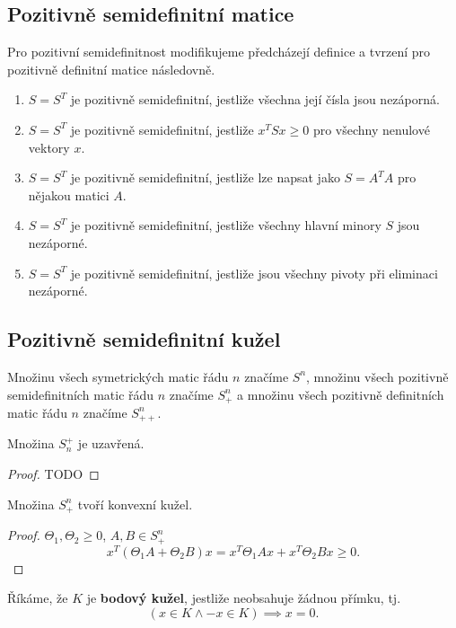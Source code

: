 \subsection*{Pozitivně semidefinitní matice}

Pro pozitivní semidefinitnost modifikujeme předcházejí definice a tvrzení pro pozitivně definitní matice následovně.
\begin{enumerate}
    \item $S = S^T$ je pozitivně semidefinitní, jestliže všechna její čísla jsou nezáporná.
    \item $S = S^T$ je pozitivně semidefinitní, jestliže $x^TSx \geq 0$ pro všechny nenulové vektory $x$.
    \item $S = S^T$ je pozitivně semidefinitní, jestliže lze napsat jako $S = A^T A$ pro nějakou matici $A$.
    \item $S = S^T$ je pozitivně semidefinitní, jestliže všechny hlavní minory $S$ jsou nezáporné.
    \item $S = S^T$ je pozitivně semidefinitní, jestliže jsou všechny pivoty při eliminaci nezáporné.
\end{enumerate}

\subsection*{Pozitivně semidefinitní kužel}

Množinu všech symetrických matic řádu $n$ značíme $S^n$, množinu všech pozitivně semidefinitních matic řádu $n$ značíme $S_+^n$ a množinu všech pozitivně definitních matic řádu $n$ značíme $S_{++}^n$.

\begin{lm2}
    Množina $S_n^+$ je uzavřená.
\end{lm2}

\begin{proof}
    TODO
\end{proof}

\begin{lm2}
    Množina $S_+^n$ tvoří konvexní kužel.
\end{lm2}

\begin{proof}
    $\Theta_1, \Theta_2 \geq 0$, $A, B \in S_+^n$
    $$
        x^T \left( \Theta_1 A + \Theta_2 B \right) x = x^T \Theta_1 A x + x^T \Theta_2 B x \geq 0.
    $$
\end{proof}

Říkáme, že $K$ je \textbf{bodový kužel}, jestliže neobsahuje žádnou přímku, tj.
$$
    (x \in K \wedge -x \in K) \implies x = 0.
$$

